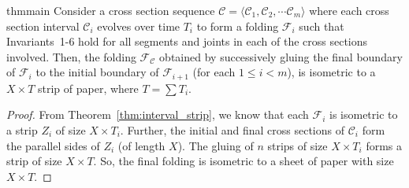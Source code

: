 \begin{restatable}{thm}{main}
\label{thm:main}
Consider a cross section sequence $\mathcal C = \langle \mathcal C_1, \mathcal C_2,\cdots \mathcal C_m \rangle$ where each
cross section interval $\mathcal C_i$ evolves over time $T_i$ to form a folding $\mathcal F_i$
such that Invariants~1-6 hold for all segments and joints in each of the cross sections involved.
Then, the folding $\mathcal F_{\mathcal C}$ obtained by successively gluing the final boundary of $\mathcal F_i$ to the initial boundary
of $\mathcal F_{i+1}$ (for each $1\le i<m$), is isometric to a $X\times T$ strip of paper, where $T = \sum T_i$.
\end{restatable}
\begin{proof}
From Theorem~\ref{thm:interval_strip}, we know that each $\mathcal F_i$ is isometric to a strip $Z_i$ of size $X\times T_i$.
Further, the initial and final cross sections of $\mathcal C_i$ form the parallel sides of $Z_i$ (of length $X$).
The gluing of $n$ strips of size $X\times T_i$ forms a strip of size $X\times T$.
So, the final folding is isometric to a sheet of paper with size $X\times T$.
\end{proof}
